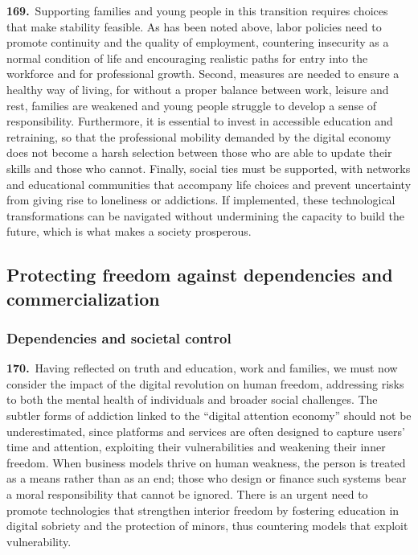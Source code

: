 \documentclass{article}
\begin{document}
\textbf{169.}\ Supporting families and young people in this transition requires choices that make stability feasible. As has been noted above, labor policies need to promote continuity and the quality of employment, countering insecurity as a normal condition of life and encouraging realistic paths for entry into the workforce and for professional growth. Second, measures are needed to ensure a healthy way of living, for without a proper balance between work, leisure and rest, families are weakened and young people struggle to develop a sense of responsibility. Furthermore, it is essential to invest in accessible education and retraining, so that the professional mobility demanded by the digital economy does not become a harsh selection between those who are able to update their skills and those who cannot. Finally, social ties must be supported, with networks and educational communities that accompany life choices and prevent uncertainty from giving rise to loneliness or addictions. If implemented, these technological transformations can be navigated without undermining the capacity to build the future, which is what makes a society prosperous.

\subsection{Protecting freedom against dependencies and commercialization}

\subsubsection{Dependencies and societal control}

\textbf{170.}\ Having reflected on truth and education, work and families, we must now consider the impact of the digital revolution on human freedom, addressing risks to both the mental health of individuals and broader social challenges. The subtler forms of addiction linked to the ``digital attention economy'' should not be underestimated, since platforms and services are often designed to capture users' time and attention, exploiting their vulnerabilities and weakening their inner freedom. When business models thrive on human weakness, the person is treated as a means rather than as an end; those who design or finance such systems bear a moral responsibility that cannot be ignored. There is an urgent need to promote technologies that strengthen interior freedom by fostering education in digital sobriety and the protection of minors, thus countering models that exploit vulnerability.
\end{document}

